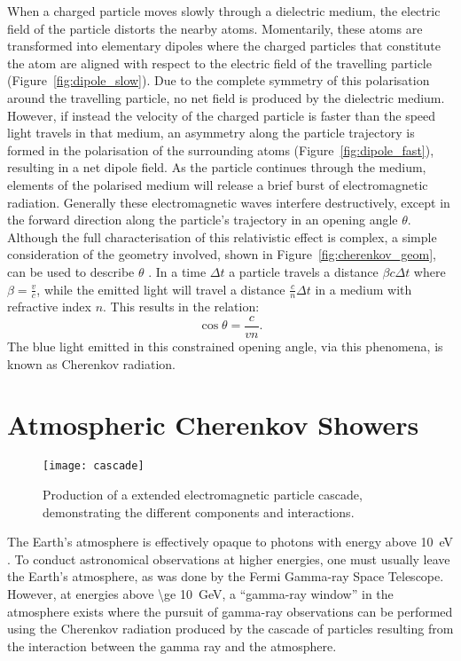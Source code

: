 When a charged particle moves slowly through a dielectric medium, the electric field of the particle distorts the nearby atoms. Momentarily, these atoms are transformed into elementary dipoles where the charged particles that constitute the atom are aligned with respect to the electric field of the travelling particle (Figure~\ref{fig:dipole_slow}). Due to the complete symmetry of this polarisation around the travelling particle, no net field is produced by the dielectric medium. However, if instead the velocity of the charged particle is faster than the speed light travels in that medium, an asymmetry along the particle trajectory is formed in the polarisation of the surrounding atoms (Figure~\ref{fig:dipole_fast}), resulting in a net dipole field. As the particle continues through the medium, elements of the polarised medium will release a brief burst of electromagnetic radiation. Generally these electromagnetic waves interfere destructively, except in the forward direction along the particle's trajectory in an opening angle $\theta$. Although the full characterisation of this relativistic effect is complex, a simple consideration of the geometry involved, shown in Figure~\ref{fig:cherenkov_geom}, can be used to describe $\theta$ \cite{Jelley1958a}. In a time $\Delta t$ a particle travels a distance $\beta c \Delta t$ where $\beta = \frac{v}{c}$, while the emitted light will travel a distance $\frac{c}{n} \Delta t$ in a medium with refractive index $n$. This results in the relation:
\begin{equation} \label{eq:cherenkov_angle}
\cos \theta = \frac{c}{vn}.
\end{equation}
The blue light emitted in this constrained opening angle, via this phenomena, is known as Cherenkov radiation.

\section{Atmospheric Cherenkov Showers} \label{section:cherenkov_shower_intro}

\begin{figure}
	\centering\texttt{[image: cascade]} 
	\caption[Production of an extended electromagnetic particle cascade.]{Production of a extended electromagnetic particle cascade, demonstrating the different components and interactions.}
	\label{fig:cascade}
\end{figure}

The Earth's atmosphere is effectively opaque to photons with energy above \SI{10}{eV} \cite{Weekes2003}. To conduct astronomical observations at higher energies, one must usually leave the Earth's atmosphere, as was done by the Fermi Gamma-ray Space Telescope. However, at energies above \SI{\ge 10}{GeV}, a ``gamma-ray window'' in the atmosphere exists where the pursuit of gamma-ray observations can be performed using the Cherenkov radiation produced by the cascade of particles resulting from the interaction between the gamma ray and the atmosphere.


